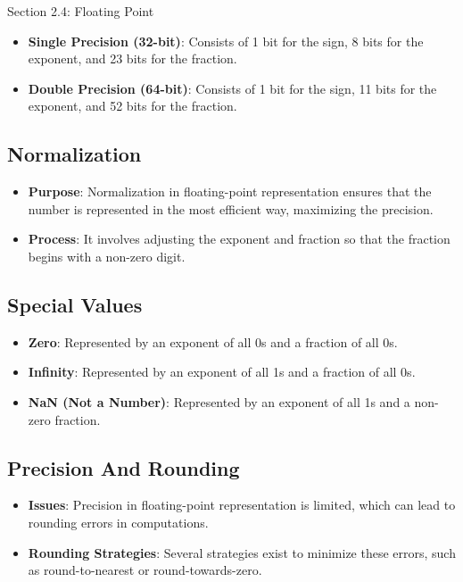 \begin{notes}{Section 2.4: Floating Point}
    \begin{itemize}
        \item \textbf{Single Precision (32-bit)}: Consists of 1 bit for the sign, 8 bits for the exponent, and 23 bits for the fraction.
        \item \textbf{Double Precision (64-bit)}: Consists of 1 bit for the sign, 11 bits for the exponent, and 52 bits for the fraction.
    \end{itemize}

    \subsection*{Normalization}

    \begin{itemize}
        \item \textbf{Purpose}: Normalization in floating-point representation ensures that the number is represented in the most efficient way, maximizing the precision.
        \item \textbf{Process}: It involves adjusting the exponent and fraction so that the fraction begins with a non-zero digit.
    \end{itemize}

    \subsection*{Special Values}

    \begin{itemize}
        \item \textbf{Zero}: Represented by an exponent of all 0s and a fraction of all 0s.
        \item \textbf{Infinity}: Represented by an exponent of all 1s and a fraction of all 0s.
        \item \textbf{NaN (Not a Number)}: Represented by an exponent of all 1s and a non-zero fraction.
    \end{itemize}

    \subsection*{Precision And Rounding}

    \begin{itemize}
        \item \textbf{Issues}: Precision in floating-point representation is limited, which can lead to rounding errors in computations.
        \item \textbf{Rounding Strategies}: Several strategies exist to minimize these errors, such as round-to-nearest or round-towards-zero.
    \end{itemize}


\end{notes}

